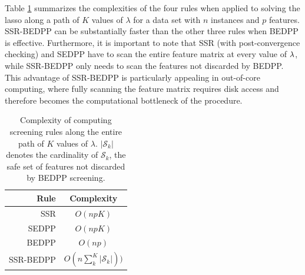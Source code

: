 Table \ref{tab_complexity} summarizes the complexities of the four rules when applied to solving the lasso along a path of $K$ values of $\lambda$ for a data set with $n$ instances and $p$ features.  SSR-BEDPP can be substantially faster than the other three rules when BEDPP is effective. Furthermore, it is important to note that SSR (with post-convergence checking) and SEDPP have to scan the entire feature matrix at every value of $\lambda$, while SSR-BEDPP only needs to scan the features not discarded by BEDPP.  This advantage of SSR-BEDPP is particularly appealing in out-of-core computing, where fully scanning the feature matrix requires disk access and therefore becomes the computational bottleneck of the procedure.
\begin{table}[h]
\centering
\begin{tabular}{rc}
\toprule
Rule & Complexity\\
\midrule
SSR &  $O(np K)$\\
SEDPP & $O(np K)$ \\
BEDPP & $O(np)$\\
SSR-BEDPP & $O(n\sum_k^K |\mathcal{S}_k|))$\\
\bottomrule
\end{tabular}
\caption{Complexity of computing screening rules along the entire path of $K$ values of $\lambda$. $| \mathcal{S}_k |$ denotes the cardinality of $\mathcal{S}_k$, the safe set of features not discarded by BEDPP screening.}
\label{tab_complexity}
\end{table}
%

